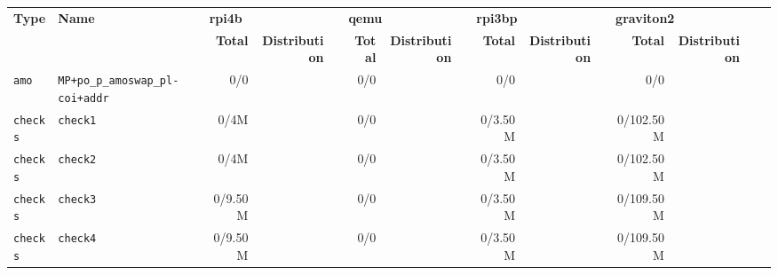 \begin{tabular}{l l  | r r l | r r l | r r l | r r l l}
   \textbf{Type}       & \textbf{Name}                                               & \multicolumn{3}{l}{\textbf{rpi4b}}                         & \multicolumn{3}{l}{\textbf{qemu}}        & \multicolumn{3}{l}{\textbf{rpi3bp}}                         & \multicolumn{3}{l}{\textbf{graviton2}}                          & \\
                       &                                                             & \textbf{Total} & \textbf{Distribution} &                   & \textbf{Total} & \textbf{Distribution} &  & \textbf{Total} & \textbf{Distribution} &                   & \textbf{Total} & \textbf{Distribution} &                    & \\
            \verb|amo| &                          \verb|MP+po_p_amoswap_pl-coi+addr| &            0/0 &                       &                   &            0/0 &                       &  &            0/0 &                       &                   &            0/0 &                       &                    & \\ \hline 
         \verb|checks| &                                               \verb|check1| &           0/4M &                       &                   &            0/0 &                       &  &        0/3.50M &                       &                   &      0/102.50M &                       &                    & \\ \hline 
         \verb|checks| &                                               \verb|check2| &           0/4M &                       &                   &            0/0 &                       &  &        0/3.50M &                       &                   &      0/102.50M &                       &                    & \\ \hline 
         \verb|checks| &                                               \verb|check3| &        0/9.50M &                       &                   &            0/0 &                       &  &        0/3.50M &                       &                   &      0/109.50M &                       &                    & \\ \hline 
         \verb|checks| &                                               \verb|check4| &        0/9.50M &                       &                   &            0/0 &                       &  &        0/3.50M &                       &                   &      0/109.50M &                       &                    & \\ \hline 

\end{tabular}
